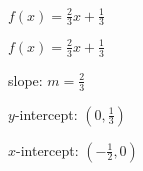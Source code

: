 {$f(x) = \frac{2}{3} x + \frac{1}{3}$}
{$f(x) = \frac{2}{3} x + \frac{1}{3}$

slope: $m = \frac{2}{3}$ 

$y$-intercept:  $\left(0, \frac{1}{3}\right)$

$x$-intercept:  $\left(-\frac{1}{2}, 0\right)$

\begin{center}
\end{center}}